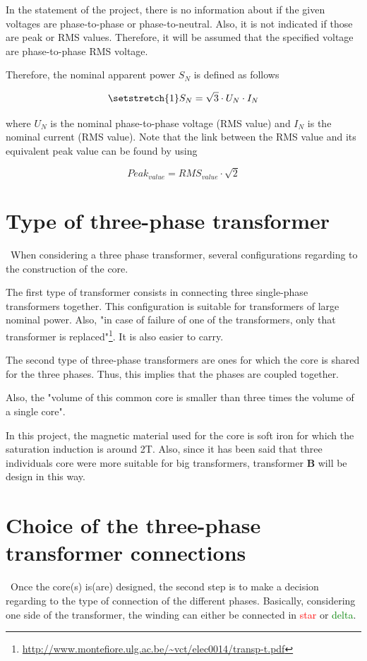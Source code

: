 \documentclass[12pt,a4paper]{report}
\begin{document}
In the statement of the project, there is no information about if the given voltages are phase-to-phase or phase-to-neutral. Also, it is not indicated if those are peak or RMS values. Therefore, it will be assumed that the specified voltage are phase-to-phase RMS voltage.

Therefore, the nominal apparent power $S_N$ is defined as follows

\begin{equation}
\setstretch{1}
    S_N = \sqrt{3}\cdot U_N\cdot I_N
\end{equation}

where $U_N$ is the nominal phase-to-phase voltage (RMS value) and $I_N$ is the nominal current (RMS value). Note that the link between the RMS value and its equivalent peak value can be found by using

\begin{equation}
    Peak_{value} = RMS_{value} \cdot \sqrt{2}
\end{equation}


\section{Type of three-phase transformer}
\quad\, When considering a three phase transformer, several configurations regarding to the construction of the core.

The first type of transformer consists in connecting three single-phase transformers together. This configuration is suitable for transformers of large nominal power. Also, "in case of failure of one of the transformers, only that transformer is replaced"\footnote{\url{http://www.montefiore.ulg.ac.be/~vct/elec0014/transp-t.pdf}}. It is also easier to carry.

The second type of three-phase transformers are ones for which the core is shared for the three phases. Thus, this implies that the phases are coupled together.

Also, the "volume of this common core is smaller than three times the volume of a single core".

In this project, the magnetic material used for the core is soft iron for which the saturation induction is around 2T. Also, since it has been said that three individuals core were more suitable for big transformers, transformer \textbf{B} will be design in this way.

\section{Choice of the three-phase transformer connections}
\quad\, Once the core(s) is(are) designed, the second step is to make a decision regarding to the type of connection of the different phases. Basically, considering one side of the transformer, the winding can either be connected in \textcolor{red}{star} or \textcolor{green}{delta}.
\end{document}
